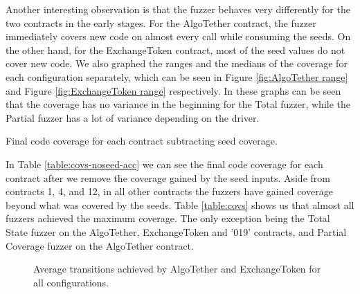 Another interesting observation is that the fuzzer behaves very differently for the two contracts in the early stages.
For the AlgoTether contract, the fuzzer immediately covers new code on almost every call while consuming the seeds.
On the other hand, for the ExchangeToken contract, most of the seed values do not cover new code.
We also graphed the ranges and the medians of the coverage for each configuration separately, which can be seen in Figure \ref{fig:AlgoTether range} and Figure \ref{fig:ExchangeToken range} respectively.
In these graphs can be seen that the coverage has no variance in the beginning for the Total fuzzer, while the Partial fuzzer has a lot of variance depending on the driver.

\begin{table}[htbp]
    \centering
    \caption{Final code coverage for each contract subtracting seed coverage.}\label{table:covs-noseed-acc}
\end{table}

In Table \ref{table:covs-noseed-acc} we can see the final code coverage for each contract after we remove the coverage gained by the seed inputs.
Aside from contracts 1, 4, and 12, in all other contracts the fuzzers have gained coverage beyond what was covered by the seeds.
Table \ref{table:covs} shows us that almost all fuzzers achieved the maximum coverage.
The only exception being the Total State fuzzer on the AlgoTether, ExchangeToken and '019' contracts, and Partial Coverage fuzzer on the AlgoTether contract.



\begin{figure}[htbp]
    \centering
    \hfill
    \caption{Average transitions achieved by AlgoTether and ExchangeToken for all configurations.}
    \label{fig:unique_transitions}
\end{figure}

